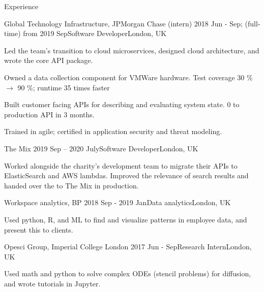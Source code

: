 \documentclass[10pt]{resume} %
\begin{document}
\begin{rSection}{Experience}


  \begin{rSubsection}{Global Technology Infrastructure, JPMorgan Chase}
    {(intern) 2018 Jun - Sep; (full-time) from 2019 Sep}{Software Developer}{London, UK}
  \item Led the team's transition to cloud microservices, designed cloud
    architecture, and wrote the core API package.
  \item Owned a data collection component for VMWare hardware. Test coverage 30
    \% $\rightarrow$ 90 \%; runtime 35 times faster
  \item Built customer facing APIs for describing and evaluating system state.
    0 to production API in 3 months.
  \item Trained in agile; certified in application security and threat modeling.
  \end{rSubsection}


  \begin{rSubsection}{The Mix}
    {2019 Sep -- 2020 July}{Software Developer}{London, UK}
  \item Worked alongside the charity's development team to migrate their
    APIs to ElasticSearch and AWS lambdas. Improved the relevance of search
    results and handed over the to The Mix in production.
  \end{rSubsection}


  \begin{rSubsection}{Workspace analytics, BP}
    {2018 Sep - 2019 Jan}{Data analytics}{London, UK}
  \item Used python, R, and ML to find and visualize patterns in employee data,
    and present this to clients.
  \end{rSubsection}


  \begin{rSubsection}{Opesci Group, Imperial College London}
    {2017 Jun - Sep}{Research Intern}{London, UK}
  \item Used math and python to solve complex ODEs (stencil problems) for
    diffusion, and wrote tutorials in Jupyter.
  \end{rSubsection}


\end{rSection}
\end{document}
